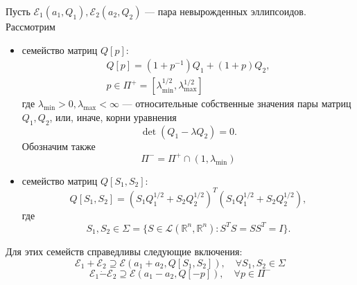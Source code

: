 \begin{theorem}\label{ellips_theorem}
    Пусть \( \mathcal{E}_1(a_1, Q_1), \mathcal{E}_2(a_2, Q_2) \) --- пара невырожденных эллипсоидов. Рассмотрим
    \begin{itemize}
        \item семейство матриц \( Q[p] \):
        \begin{equation*}
            \begin{gathered}
                Q[p] = (1 + p^{-1})Q_1 + (1 + p) Q_2,\\
                p \in \Pi^+ = \left[ \lambda_{\mathrm{min}}^{1/2}, \lambda_{\mathrm{max}}^{1/2} 
                 \right]
            \end{gathered}
        \end{equation*}
        где \( \lambda_{\mathrm{min}} > 0, \lambda_{\mathrm{max}} < \infty \) --- относительные
         собственные
        значения пары матриц \( Q_1, Q_2 \), или, иначе, корни уравнения
        \begin{equation*}
            \det (Q_1 - \lambda Q_2) = 0.
        \end{equation*}
        Обозначим также
        \begin{equation*}
            \Pi^- = \Pi^+ \cap(1, \lambda_{\mathrm{min}})
        \end{equation*}
        \item семейство матриц \( Q[S_1,S_2] \):
        \begin{equation*}
            Q[S_1, S_2] = (S_1 Q_1^{1/2} + S_2 Q_2^{1/2})^T (S_1 Q_1^{1/2} + S_2 Q_2^{1/2}),
        \end{equation*}
        где
        \begin{equation*}
            S_1, S_2 \in \Sigma = \{ S \in \mathcal{L}(\mathbb{R}^n, \mathbb{R}^n): S^T S = S S^T = I \}.
        \end{equation*}
    \end{itemize}
    Для этих семейств справедливы следующие включения:
    \begin{equation}
        \mathcal{E}_1 + \mathcal{E}_2 \supseteq \mathcal{E}(a_1 + a_2, Q[S_1, S_2]), \quad \forall S_1, S_2 \in \Sigma
    \end{equation}
    \begin{equation}
        \mathcal{E}_1 \dot{-} \mathcal{E}_2 \supseteq \mathcal{E}(a_1 - a_2, Q[-p]), \quad \forall p \in \Pi^-
    \end{equation}
\end{theorem}

